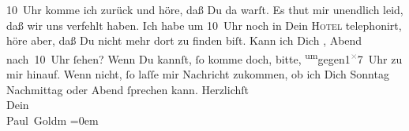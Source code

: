 \begin{ledgroupsized}[t]{13cm}
                  10 Uhr komme ich zurück und höre, daß Du da {\pb}warſt. Es thut mir unendlich leid, daß wir uns
               verfehlt haben. Ich habe um 10 Uhr noch in Dein \textsc{Hotel} telephonirt, höre aber, daß Du nicht mehr dort zu finden biſt. Kann ich Dich
                  \label{K_L03365-2v}\label{K_L03365-2h}, Abend
                  nach 10 Uhr ſehen? Wenn Du kannſt, ſo komme doch, bitte, \substVorne{}\textsuperscript{um}\substDazwischen{}gegen\substHinten{}{ }1\substVorne{}\textsuperscript{\textcolor{gray}{×}}\substDazwischen{}7\substHinten{} Uhr zu mir hinauf. Wenn {\pb}nicht, ſo laſſe
               mir Nachricht zukommen, ob ich Dich Sonntag{ }Nachmittag oder Abend ſprechen kann.\pend
           \pstart
           Herzlichſt {\\[\baselineskip]}Dein {\\[\baselineskip]}\spacefill\mbox{Paul Goldm}\pend
           \leftskip=0em{}
         
         \endnumbering{}\end{ledgroupsized}  \newcommand{\dateiname}{L03365}\newcommand{\titel}{Paul Goldmann an Arthur Schnitzler, 27. 2. [1903]}\newcommand{\editorInnen}{Martin Anton Müller und Laura Untner}
      